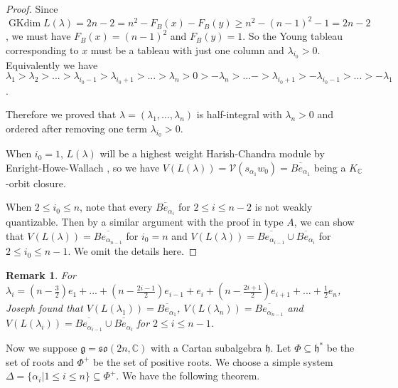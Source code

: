 \documentclass{amsart}[12pt]
\newtheorem{Rem}{Remark}[section]
\renewcommand{\subset}{\subseteq}
\newcommand{\gkd}{\operatorname{GKdim}}
\numberwithin{equation}{section}
\begin{document}
\begin{proof}
Since $\gkd L(\lambda)=2n-2=n^2-F_B(x)-F_B(y)\geq n^2-(n-1)^2-1=2n-2$, we must have $F_B(x)=(n-1)^2$ and $F_B(y)=1$.
So the Young tableau corresponding to $x$ must be a  tableau with just one column and $\lambda_{i_0}>0$. Equivalently we have $\lambda_1>\lambda_2>...>\lambda_{i_0-1}>\lambda_{i_0+1}>...>\lambda_n>0>-\lambda_n>...->\lambda_{i_0+1}>-\lambda_{i_0-1}>...>-\lambda_1$.

Therefore we proved that 	$\lambda=(\lambda_1,...,\lambda_n)$ is half-integral with $\lambda_n>0$ and ordered after removing one term $\lambda_{i_0}>0$.

When $i_0=1$, $L(\lambda)$ will be a highest weight Harish-Chandra module by Enright-Howe-Wallach \cite{EHW}, so we have $V(L(\lambda))=\mathcal{V}(s_{\alpha_{1}}w_0)=\overline{Be_{\alpha_{1}}}$ being a $K_{\mathbb{C}}$-orbit closure.

When $2\leq i_0\leq n$, note that every $\overline{Be_{\alpha_i}}$ for $ 2\leq i\leq n-2$ is not weakly quantizable. Then by a similar argument with the proof in type $A$, we can show that $V(L(\lambda))=\overline{Be_{\alpha_{n-1}}}$ for $i_0=n$ and $V(L(\lambda))=\overline{Be_{\alpha_{i-1}}}\cup \overline{Be_{\alpha_{i}}}$ for $2\leq i_0\leq n-1$. We omit the details here.


\end{proof}


\begin{Rem}
For  $\lambda_i=(n-\frac{3}{2})e_1+...+(n-\frac{2i-1}{2})e_{i-1}+e_{i}+(n-\frac{2i+1}{2})e_{i+1}+...+\frac{1}{2}e_n$, Joseph \cite{Jo98} found that $V(L(\lambda_{1}))=\overline{Be_{\alpha_{1}}}$, $V(L(\lambda_{n}))=\overline{Be_{\alpha_{n-1}}}$ and $V(L(\lambda_i))=\overline{Be_{\alpha_{i-1}}}\cup \overline{Be_{\alpha_{i}}}$ for $2\leq i\leq n-1$.

	
\end{Rem}




Now	we suppose  $\mathfrak{g}=\mathfrak{so}(2n, \mathbb{C})$ with a Cartan subalgebra $\mathfrak{h}$. Let $\Phi\subseteq \mathfrak{h}^*$ be the set of roots and $\Phi^+$ be the set of positive roots. We choose  a simple system $\Delta=\{\alpha_i|1\leq i\leq n\}\subset\Phi^+$. We have the following theorem.
\end{document}
